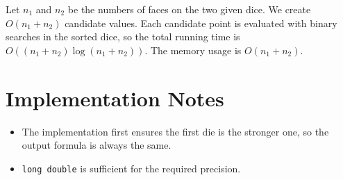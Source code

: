 \documentclass[11pt]{article}
\begin{document}
Let $n_1$ and $n_2$ be the numbers of faces on the two given dice. We create $O(n_1+n_2)$ candidate
values. Each candidate point is evaluated with binary searches in the sorted dice, so the total running
time is $O((n_1+n_2)\log(n_1+n_2))$. The memory usage is $O(n_1+n_2)$.

\section*{Implementation Notes}

\begin{itemize}[leftmargin=*]
    \item The implementation first ensures the first die is the stronger one, so the output formula is
    always the same.
    \item \texttt{long double} is sufficient for the required precision.
\end{itemize}
\end{document}
